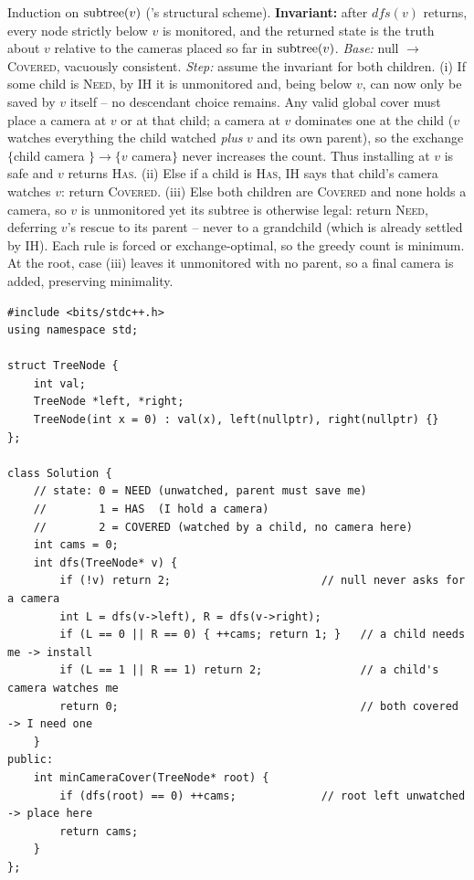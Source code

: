 \begin{proofbox}
Induction on $\operatorname{subtree}(v)$ ('s structural scheme).
\textbf{Invariant:} after $\mathit{dfs}(v)$ returns, every node strictly below $v$ is
monitored, and the returned state is the truth about $v$ relative to the cameras placed
so far in $\operatorname{subtree}(v)$.
\emph{Base:} null $\to$ \textsc{Covered}, vacuously consistent.
\emph{Step:} assume the invariant for both children.
(i) If some child is \textsc{Need}, by IH it is unmonitored and, being below $v$, can
now only be saved by $v$ itself -- no descendant choice remains. Any valid global
cover must place a camera at $v$ or at that child; a camera at $v$ dominates one at the
child ($v$ watches everything the child watched \emph{plus} $v$ and its own parent), so
the exchange $\{$child camera $\}\to\{v$ camera$\}$ never increases the count. Thus
installing at $v$ is safe and $v$ returns \textsc{Has}.
(ii) Else if a child is \textsc{Has}, IH says that child's camera watches $v$: return
\textsc{Covered}.
(iii) Else both children are \textsc{Covered} and none holds a camera, so $v$ is
unmonitored yet its subtree is otherwise legal: return \textsc{Need}, deferring $v$'s
rescue to its parent -- never to a grandchild (which is already settled by IH).
Each rule is forced or exchange-optimal, so the greedy count is minimum. At the root,
case (iii) leaves it unmonitored with no parent, so a final camera is added, preserving
minimality. \end{proofbox}

\begin{lstlisting}[caption={Binary Tree Cameras (LeetCode 968) -- three-state greedy post-order}, label={lst:c02-cameras}]
#include <bits/stdc++.h>
using namespace std;

struct TreeNode {
    int val;
    TreeNode *left, *right;
    TreeNode(int x = 0) : val(x), left(nullptr), right(nullptr) {}
};

class Solution {
    // state: 0 = NEED (unwatched, parent must save me)
    //        1 = HAS  (I hold a camera)
    //        2 = COVERED (watched by a child, no camera here)
    int cams = 0;
    int dfs(TreeNode* v) {
        if (!v) return 2;                       // null never asks for a camera
        int L = dfs(v->left), R = dfs(v->right);
        if (L == 0 || R == 0) { ++cams; return 1; }   // a child needs me -> install
        if (L == 1 || R == 1) return 2;               // a child's camera watches me
        return 0;                                     // both covered -> I need one
    }
public:
    int minCameraCover(TreeNode* root) {
        if (dfs(root) == 0) ++cams;             // root left unwatched -> place here
        return cams;
    }
};
\end{lstlisting}

